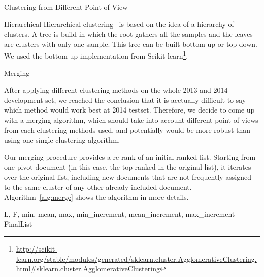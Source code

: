 \begin{subsection}{Clustering from Different Point of View}
\begin{subsubsection}{Hierarchical}
Hierarchical clustering~\cite{hierarchical} is based on the idea of a hierarchy of clusters. A tree is build in which the root gathers all the samples and the leaves are clusters with only one sample. This tree can be built bottom-up or top down. We used the bottom-up implementation from Scikit-learn\footnote{\url{http://scikit-learn.org/stable/modules/generated/sklearn.cluster.AgglomerativeClustering.html#sklearn.cluster.AgglomerativeClustering}}.

\end{subsubsection}

\begin{subsubsection}{Merging}

After applying different clustering methods on the whole 2013 and 2014 development set, 
we reached the conclusion that it is acctually difficult to say which method would work best at 2014 testset.
Therefore, we decide to come up with a merging algorithm, which should take into account different point of views from each clustering methods used,
and potentially would be more robust than using one single clustering algorithm.

Our merging procedure provides a re-rank of an initial ranked list. Starting from one pivot document (in this case, the top ranked in the original list), 
it iterates over the original list, including new documents that are not frequently assigned to the same cluster of any other already included document. 
Algorithm~\ref{alg:merge} shows the algorithm in more details.


\renewcommand{\algorithmicrequire}{\textbf{Input:}}
\renewcommand{\algorithmicensure}{\textbf{Output:}}
\newcommand{\algorithmicbreak}{\textbf{break}}
\newcommand{\Break}{\State \algorithmicbreak}
\algrenewcommand\Return{\State \algorithmicreturn{} }%
\begin{algorithm}
\caption{Merging of different clustering methods}
\label{alg:merge}
\begin{algorithmic}[1]
\Require L, F, min, mean, max, min\_increment, mean\_increment, max\_increment
\Ensure FinalList 


\end{algorithmic}
\end{algorithm}
\end{subsubsection}
\end{subsection}
